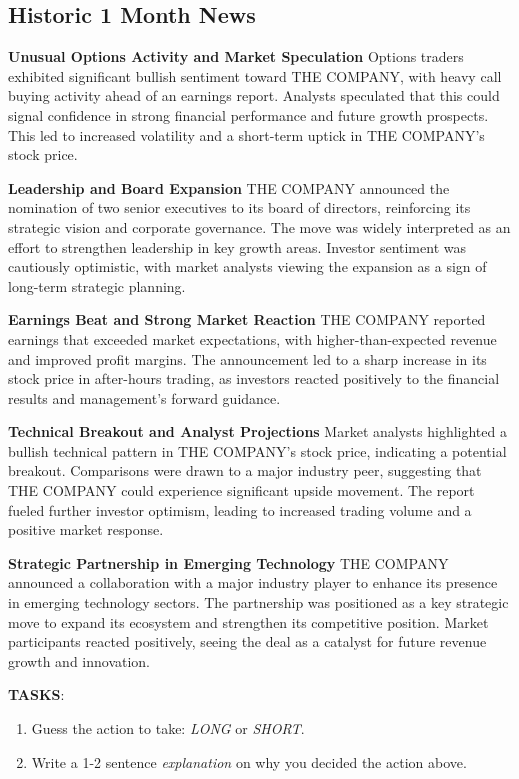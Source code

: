 \documentclass[8pt]{scrartcl}
\begin{document}
\subsection*{Historic 1 Month News}

\textbf{Unusual Options Activity and Market Speculation}
Options traders exhibited significant bullish sentiment toward THE COMPANY, with heavy call buying activity ahead of an earnings report. Analysts speculated that this could signal confidence in strong financial performance and future growth prospects. This led to increased volatility and a short-term uptick in THE COMPANY's stock price.

\textbf{Leadership and Board Expansion}
THE COMPANY announced the nomination of two senior executives to its board of directors, reinforcing its strategic vision and corporate governance. The move was widely interpreted as an effort to strengthen leadership in key growth areas. Investor sentiment was cautiously optimistic, with market analysts viewing the expansion as a sign of long-term strategic planning.

\textbf{Earnings Beat and Strong Market Reaction}
THE COMPANY reported earnings that exceeded market expectations, with higher-than-expected revenue and improved profit margins. The announcement led to a sharp increase in its stock price in after-hours trading, as investors reacted positively to the financial results and management’s forward guidance.

\textbf{Technical Breakout and Analyst Projections}
Market analysts highlighted a bullish technical pattern in THE COMPANY's stock price, indicating a potential breakout. Comparisons were drawn to a major industry peer, suggesting that THE COMPANY could experience significant upside movement. The report fueled further investor optimism, leading to increased trading volume and a positive market response.

\textbf{Strategic Partnership in Emerging Technology}
THE COMPANY announced a collaboration with a major industry player to enhance its presence in emerging technology sectors. The partnership was positioned as a key strategic move to expand its ecosystem and strengthen its competitive position. Market participants reacted positively, seeing the deal as a catalyst for future revenue growth and innovation.


\textbf{TASKS}:

\begin{tcolorbox}[colback=blue!10, colframe=blue!60, title=\textbf{TASKS}, sharp corners=southwest]
\begin{enumerate}
    \item Guess the action to take: \textit{LONG} or \textit{SHORT}.
    \item Write a 1-2 sentence \textit{explanation} on why you decided the action above.
\end{enumerate}
\end{tcolorbox}
\end{document}
